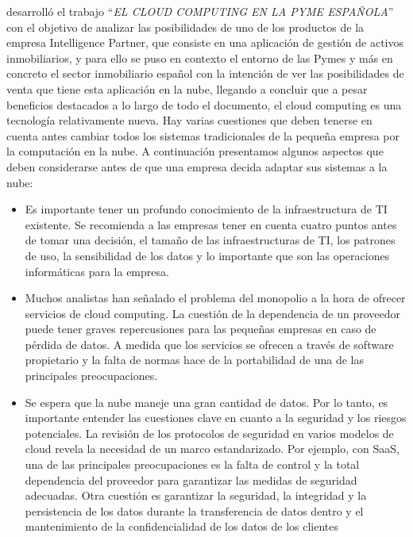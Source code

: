 \cite{diaz} desarroll\'o el trabajo ``\emph{EL CLOUD COMPUTING EN LA PYME ESPA\~NOLA}''
con el objetivo de analizar las posibilidades de uno de los productos de la empresa
Intelligence Partner, que consiste en una aplicaci\'on de gesti\'on de activos inmobiliarios, y
para ello se puso en contexto el entorno de las Pymes y m\'as en concreto el
sector inmobiliario espa\~nol con la intenci\'on de ver las posibilidades de venta
que tiene esta aplicaci\'on en la nube, llegando a concluir que a pesar beneficios
destacados a lo largo de todo el documento, el cloud computing es una tecnolog\'ia
relativamente nueva. Hay varias cuestiones que deben tenerse en cuenta antes cambiar
todos los sistemas tradicionales de la peque\~na empresa por la computaci\'on en la nube.
A continuaci\'on presentamos algunos aspectos que deben considerarse antes de que una
empresa decida adaptar sus sistemas a la nube:
\begin{itemize}
    \item Es importante tener un profundo conocimiento de la infraestructura de TI
            existente. Se recomienda a las empresas tener en cuenta cuatro puntos
            antes de tomar una decisi\'on, el tama\~no de las infraestructuras de TI, los
            patrones de uso, la sensibilidad de los datos y lo importante que son las
            operaciones inform\'aticas para la empresa.
    \item Muchos analistas han se\~nalado el problema del monopolio a la hora de
            ofrecer servicios de cloud computing. La cuesti\'on de la dependencia de
            un proveedor puede tener graves repercusiones para las peque\~nas
            empresas en caso de p\'erdida de datos. A medida que los servicios se
            ofrecen a trav\'es de software propietario y la falta de normas hace de la
            portabilidad de una de las principales preocupaciones.
    \item Se espera que la nube maneje una gran cantidad de datos. Por lo tanto,
            es importante entender las cuestiones clave en cuanto a la seguridad y
            los riesgos potenciales. La revisi\'on de los protocolos de seguridad en
            varios modelos de cloud revela la necesidad de un marco estandarizado.
            Por ejemplo, con SaaS, una de las principales preocupaciones es la falta
            de control y la total dependencia del proveedor para garantizar las
            medidas de seguridad adecuadas. Otra cuesti\'on es garantizar la
            seguridad, la integridad y la persistencia de los datos durante la
            transferencia de datos dentro y el mantenimiento de la confidencialidad
            de los datos de los clientes
\end{itemize}

